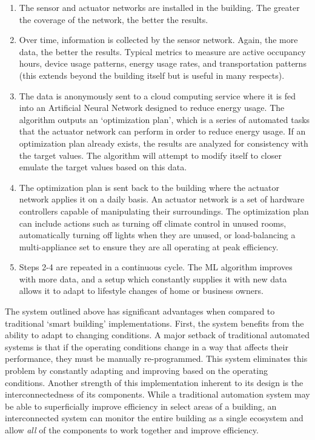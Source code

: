 \documentclass[letterpaper]{article}
\begin{document}
\begin{center}
\begin{enumerate}
\item
    The sensor and actuator networks are installed in the building. The greater the coverage of the network, the better the results.
\item
    Over time, information is collected by the sensor network. Again, the more data, the better the results. Typical metrics to measure are active occupancy hours, device usage patterns, energy usage rates, and transportation patterns (this extends beyond the building itself but is useful in many respects).
\item
    The data is anonymously sent to a cloud computing service where it is fed into an Artificial Neural Network designed to reduce energy usage. The algorithm outputs an `optimization plan', which is a series of automated tasks that the actuator network can perform in order to reduce energy usage. If an optimization plan already exists, the results are analyzed for consistency with the target values. The algorithm will attempt to modify itself to closer emulate the target values based on this data.
\item
    The optimization plan is sent back to the building where the actuator network applies it on a daily basis. An actuator network is a set of hardware controllers capable of manipulating their surroundings. The optimization plan can include actions such as turning off climate control in unused rooms, automatically turning off lights when they are unused, or load-balancing a multi-appliance set to ensure they are all operating at peak efficiency.
\item
    Steps 2-4 are repeated in a continuous cycle. The ML algorithm improves with more data, and a setup which constantly supplies it with new data allows it to adapt to lifestyle changes of home or business owners.
\end{enumerate}
\end{center}

The system outlined above has significant advantages when compared to traditional `smart building' implementations. First, the system benefits from the ability to adapt to changing conditions. A major setback of traditional automated systems is that if the operating conditions change in a way that affects their performance, they must be manually re-programmed. This system eliminates this problem by constantly adapting and improving based on the operating conditions. Another strength of this implementation inherent to its design is the interconnectedness of its components. While a traditional automation system may be able to superficially improve efficiency in select areas of a building, an interconnected system can monitor the entire building as a single ecosystem and allow \emph{all} of the components to work together and improve efficiency.\par
\end{document}
